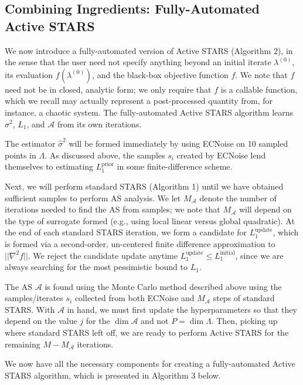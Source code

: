 \documentclass{amsart}
\newcommand{\A}{\mathcal{A}}
\begin{document}
\subsection{Combining Ingredients: Fully-Automated Active STARS} 
We now introduce a fully-automated version of Active STARS (Algorithm 2), in the sense that the user need not specify anything beyond an initial iterate $\lambda^{(0)}$, its evaluation $f(\lambda^{(0)})$, and the black-box objective function $f$. We note that $f$ need not be in closed, analytic form; we only require that $f$ is a callable function, which we recall may actually represent a post-processed quantity from, for instance, a chaotic system. The fully-automated Active STARS algorithm learns $\sigma^2$, $L_1$, and $\A$ from its own iterations.

The estimator $\hat{\sigma}^2$ will be formed immediately by using ECNoise on 10 sampled points in $\Lambda$. As discussed above, the samples $s_i$ created by ECNoise lend themselves to estimating $L_1^\text{prior}$ in some finite-difference scheme.

Next, we will perform standard STARS (Algorithm 1) until we have obtained sufficient samples to perform AS analysis. We let $M_\A$ denote the number of iterations needed to find the AS from samples; we note that $M_\A$ will depend on the type of surrogate formed (e.g., using local linear versus global quadratic). At the end of each standard STARS iteration, we form a candidate for $L_1^\text{update}$, which is formed via a second-order, un-centered finite difference approximation to $||\nabla^2 f||.$ We reject the candidate update anytime $L_1^\text{update} \leq L_1^\text{initial}$, since we are always searching for the most pessimistic bound to $L_1$.

The AS $\A$ is found using the Monte Carlo method described above using the samples/iterates $s_i$ collected from both ECNoise and $M_\A$ steps of standard STARS. With $\A$ in hand, we must first update the hyperparameters so that they depend on the value $j$ for the $\dim \A$ and not $P = \dim \Lambda$. Then, picking up where standard STARS left off, we are ready to perform Active STARS for the remaining $M-M_\A$ iterations.

We now have all the necessary components for creating a fully-automated Active STARS algorithm, which is presented in Algorithm 3 below.

\vspace{.25cm}
\end{document}
